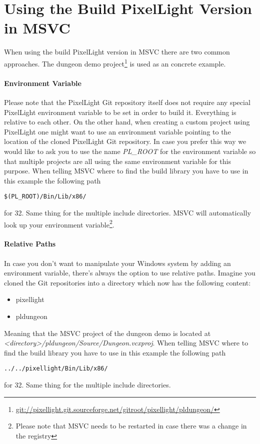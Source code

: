 \section{Using the Build PixelLight Version in \ac{MSVC}}

When using the build PixelLight version in \ac{MSVC} there are two common approaches. The dungeon demo project\footnote{\url{git://pixellight.git.sourceforge.net/gitroot/pixellight/pldungeon/}} is used as an concrete example.


\paragraph{Environment Variable}
Please note that the PixelLight Git repository itself does not require any special PixelLight environment variable to be set in order to build it. Everything is relative to each other. On the other hand, when creating a custom project using PixelLight one might want to use an environment variable pointing to the location of the cloned PixelLight Git repository. In case you prefer this way we would like to ask you to use the name \emph{PL\_ROOT} for the environment variable so that multiple projects are all using the same environment variable for this purpose. When telling \ac{MSVC} where to find the build library you have to use in this example the following path
\begin{verbatim}
$(PL_ROOT)/Bin/Lib/x86/
\end{verbatim}
for \SI{32}{\bit}. Same thing for the multiple include directories. \ac{MSVC} will automatically look up your environment variable\footnote{Please note that \ac{MSVC} needs to be restarted in case there was a change in the registry}.


\paragraph{Relative Paths}
In case you don't want to manipulate your Windows system by adding an environment variable, there's always the option to use relative paths. Imagine you cloned the Git repositories into a directory which now has the following content:
\begin{itemize}
\item{pixellight}
\item{pldungeon}
\end{itemize}
Meaning that the \ac{MSVC} project of the dungeon demo is located at \emph{<directory>/pldungeon/Source/Dungeon.vcxproj}. When telling \ac{MSVC} where to find the build library you have to use in this example the following path
\begin{verbatim}
../../pixellight/Bin/Lib/x86/
\end{verbatim}
for \SI{32}{\bit}. Same thing for the multiple include directories.
